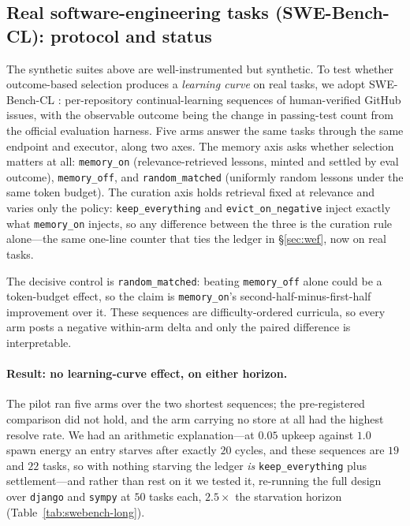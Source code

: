 \subsection{Real software-engineering tasks (SWE-Bench-CL): protocol and status}
\label{sec:swebench}
The synthetic suites above are well-instrumented but synthetic. To test
whether outcome-based selection produces a \emph{learning curve} on
real tasks, we adopt SWE-Bench-CL \citep{joshi2025swebenchcl,
jimenez2024swebench}: per-repository continual-learning sequences of
human-verified GitHub issues, with the observable outcome being the change
in passing-test count from the official evaluation harness. Five arms
answer the same tasks through the same endpoint and executor, along two
axes. The memory axis asks whether selection matters at all:
\texttt{memory\_on} (relevance-retrieved lessons, minted and settled by
eval outcome), \texttt{memory\_off}, and \texttt{random\_matched}
(uniformly random lessons under the same token budget). The curation
axis holds retrieval fixed at relevance and varies only the policy:
\texttt{keep\_everything} and \texttt{evict\_on\_negative} inject
exactly what \texttt{memory\_on} injects, so any difference between the
three is the curation rule alone---the same one-line counter that ties
the ledger in \S\ref{sec:wef}, now on real tasks.

The decisive control is \texttt{random\_matched}: beating
\texttt{memory\_off} alone could be a token-budget effect, so the claim is
\texttt{memory\_on}'s second-half-minus-first-half improvement over it.
These sequences are difficulty-ordered curricula, so every arm posts a
negative within-arm delta and only the paired difference is
interpretable. 

\paragraph{Result: no learning-curve effect, on either horizon.}
The pilot ran five arms over the two shortest sequences; the
pre-registered comparison did not hold, and the arm carrying no store at
all had the highest resolve rate. We had an arithmetic explanation---at
$0.05$ upkeep against $1.0$ spawn energy an entry starves after exactly
$20$ cycles, and these sequences are $19$ and $22$ tasks, so with nothing
starving the ledger \emph{is} \texttt{keep\_everything} plus
settlement---and rather than rest on it we tested it, re-running the full
design over \texttt{django} and \texttt{sympy} at $50$ tasks each,
$2.5\times$ the starvation horizon (Table~\ref{tab:swebench-long}).

